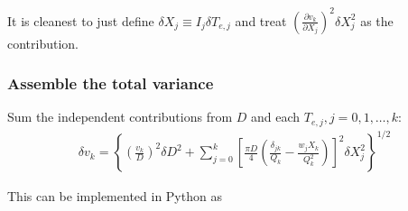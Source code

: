 \documentclass[11pt,twoside]{article}
\begin{document}
It is cleanest to just define $\delta X_j \equiv I_j \delta T_{e,j}$ and treat $\left(\frac{\partial v_k}{\partial X_j} \right)^2 \delta X_j^2$ as the contribution.

\subsubsection{Assemble the total variance}
Sum the independent contributions from $D$ and each $T_{e,j}, j=0,1,\ldots,k$:
\begin{align}
    \boxed{
        \delta v_k = \left\{\left( \frac{v_k}{D}\right)^2 \delta D^2 + \sum_{j=0}^k\left[ \frac{\pi D}{4} \left( \frac{\delta_{jk}}{Q_k} - \frac{w_j X_k}{Q_k^2}\right)\right]^2\delta X_j^2\right\}^{1/2}
    }
\end{align}

This can be implemented in Python as
\end{document}
